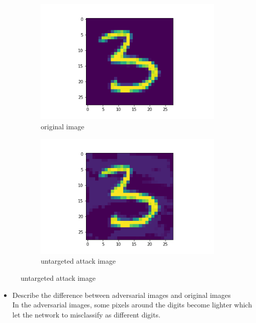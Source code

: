 \documentclass{article}
\begin{document}
\begin{enumerate}
     	\begin{figure}[H]
     	\centering
     	\begin{subfigure}[b]{0.45\textwidth}
         	\centering
         	\includegraphics[width=\textwidth]
         	{image/No.1 original test_image.png}
         	\caption{original image}
         	\label{fig:Hyperplane Epoch 0}
     	\end{subfigure}
     	\hfill
     	\begin{subfigure}[b]{0.45\textwidth}
         	\centering
         	\includegraphics[width=\textwidth]
         	{image/No.1 perturbed test_image.png}
         	\caption{untargeted attack image}
         	\label{fig:Hyperplane Epoch 1000}
     	\end{subfigure}
     	\end{figure}
     	\begin{itemize}
     	\item
     	Describe the difference between adversarial images and original images\\
     	In the adversarial images, some pixels around the digits become lighter which let the network to misclassify as different digits.
        \end{itemize}
        

\end{enumerate}
\end{document}
